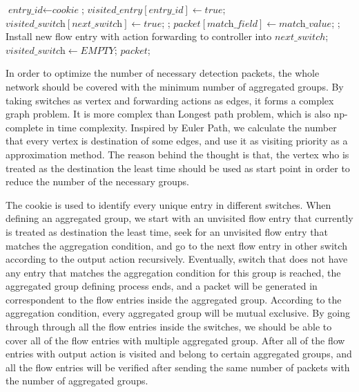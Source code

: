 \begin {tcolorbox}[blanker,float=tbp,
grow to left by=1cm, grow to right by=1cm]
\begin{algorithm}[H]
  \begin{algorithmic}[1]
        \State $\textit{entry\_id} \gets \textit{cookie}$;
          \State $\textit{visited\_entry}[\textit{entry\_id}] \gets true$;
          \State $\textit{visited\_switch}[\textit{next\_switch}] \gets true$;
            \State \Return {};
            \State $\textit{packet}[\textit{match\_field}] \gets \textit{match\_value}$;
            \State \Return {};
          \EndIf
        \EndIf
      \EndFor
      \State Install new flow entry with action forwarding to controller into $next\_switch$;
      \State $\textit{visited\_switch} \gets EMPTY$;
      \State \Return $packet$;
    \EndFunction
  \end{algorithmic}
\end{algorithm}
\end{tcolorbox}

In order to optimize the number of necessary detection packets, the whole network should be covered with the minimum number of aggregated groups. By taking switches as vertex and forwarding actions as edges, it forms a complex graph problem. It is more complex than Longest path problem, which is also np-complete in time complexity. Inspired by Euler Path, we calculate the number that every vertex is destination of some edges, and use it as visiting priority as a approximation method. The reason behind the thought is that, the vertex who is treated as the destination the least time should be used as start point in order to reduce the number of the necessary groups.

The cookie is used to identify every unique entry in different switches. When defining an aggregated group, we start with an unvisited flow entry that currently is treated as destination the least time, seek for an unvisited flow entry that matches the aggregation condition, and go to the next flow entry in other switch according to the output action recursively. Eventually, switch that does not have any entry that matches the aggregation condition for this group is reached, the aggregated group defining process ends, and a packet will be generated in correspondent to the flow entries inside the aggregated group. According to the aggregation condition, every aggregated group will be mutual exclusive. By going through through all the flow entries inside the switches, we should be able to cover all of the flow entries with multiple aggregated group. After all of the flow entries with output action is visited and belong to certain aggregated groups, and all the flow entries will be verified after sending the same number of packets with the number of aggregated groups. 

